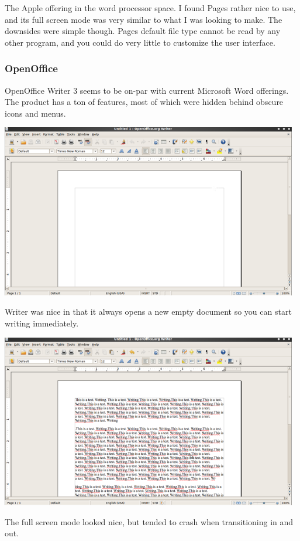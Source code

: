 \documentclass[11pt]{article}
\begin{document}
The Apple offering in the word processor space. I found Pages rather nice to use, and its full screen mode was very similar to what I was looking to make. The downsides were simple though. Pages default file type cannot be read by any other program, and you could do very little to customize the user interface.

\subsubsection{OpenOffice}


OpenOffice Writer 3 seems to be on-par with current Microsoft Word offerings. The product has a ton of features, most of which were hidden behind obscure icons and menus.

\includegraphics[width=130mm]{images/oo1.png}

Writer was nice in that it always opens a new empty document so you can start writing immediately.

\includegraphics[width=130mm]{images/oo2.png}

The full screen mode looked nice, but tended to crash when transitioning in and out.
\end{document}
